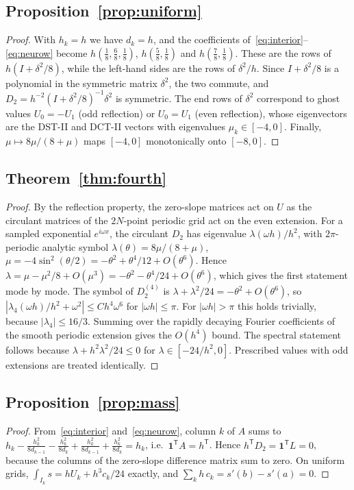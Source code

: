 \documentclass[preprint,12pt]{elsarticle}
\theoremstyle{remark}
\begin{document}
\subsection{Proposition~\ref{prop:uniform}}\label{app:uniform}
\begin{proof}
With $h_k=h$ we have $d_k=h$, and the coefficients of~\eqref{eq:interior}--\eqref{eq:neurow} become
$h(\frac18,\frac68,\frac18)$, $h(\frac58,\frac18)$ and $h(\frac78,\frac18)$. These are the rows of
$h(I+\delta^2/8)$, while the left-hand sides are the rows of $\delta^2/h$. Since $I+\delta^2/8$ is a
polynomial in the symmetric matrix $\delta^2$, the two commute, and
$D_2=h^{-2}(I+\delta^2/8)^{-1}\delta^2$ is symmetric. The end rows of $\delta^2$ correspond to ghost values
$U_0=-U_1$ (odd reflection) or $U_0=U_1$ (even reflection), whose eigenvectors are the DST-II and DCT-II
vectors with eigenvalues $\mu_k\in[-4,0]$. Finally, $\mu\mapsto8\mu/(8+\mu)$ maps $[-4,0]$ monotonically
onto $[-8,0]$.
\end{proof}

\subsection{Theorem~\ref{thm:fourth}}\label{app:fourth}
\begin{proof}
By the reflection property, the zero-slope matrices act on $U$ as the circulant matrices of the
$2N$-point periodic grid act on the even extension. For a sampled exponential $e^{i\omega x}$, the
circulant $D_2$ has eigenvalue $\lambda(\omega h)/h^2$, with $2\pi$-periodic analytic symbol
$\lambda(\theta)=8\mu/(8+\mu)$, $\mu=-4\sin^2(\theta/2)=-\theta^2+\theta^4/12+O(\theta^6)$. Hence
$\lambda=\mu-\mu^2/8+O(\mu^3)=-\theta^2-\theta^4/24+O(\theta^6)$, which gives the first statement mode by
mode. The symbol of $D_2^{(4)}$ is $\lambda+\lambda^2/24=-\theta^2+O(\theta^6)$, so
$|\lambda_4(\omega h)/h^2+\omega^2|\le Ch^4\omega^6$ for $|\omega h|\le\pi$. For $|\omega h|>\pi$ this
holds trivially, because $|\lambda_4|\le16/3$. Summing over the rapidly decaying Fourier coefficients of
the smooth periodic extension gives the $O(h^4)$ bound. The spectral statement follows because
$\lambda+h^2\lambda^2/24\le0$ for $\lambda\in[-24/h^2,0]$. Prescribed values with odd extensions are
treated identically.
\end{proof}

\subsection{Proposition~\ref{prop:mass}}\label{app:mass}
\begin{proof}
From~\eqref{eq:interior} and~\eqref{eq:neurow}, column $k$ of $A$ sums to
$h_k-\frac{h_k^2}{8d_{k-1}}-\frac{h_k^2}{8d_k}+\frac{h_k^2}{8d_{k-1}}+\frac{h_k^2}{8d_k}=h_k$, i.e.\
$\mathbf 1^{\mathsf T}A=h^{\mathsf T}$. Hence $h^{\mathsf T}D_2=\mathbf 1^{\mathsf T}L=0$, because the columns
of the zero-slope difference matrix sum to zero. On uniform grids,
$\int_{I_k}s=hU_k+h^3c_k/24$ exactly, and $\sum_kh\,c_k=s'(b)-s'(a)=0$.
\end{proof}
\end{document}
